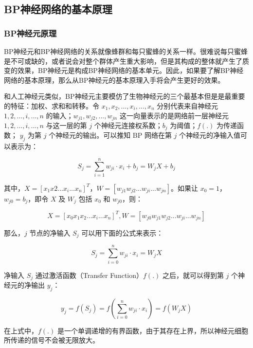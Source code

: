 \documentclass[UTF8]{ctexart}
\begin{document}
\subsection{BP神经网络的基本原理}

\subsubsection{BP神经元原理}

BP神经元和BP神经网络的关系就像蜂群和每只蜜蜂的关系一样。很难说每只蜜蜂是不可或缺的，或者说会对整个群体产生重大影响，但是其构成的整体就产生了质变的效果，BP神经元是构成BP神经网络的基本单元。因此，如果要了解BP神经网络的基本原理，那么从BP神经元的基本原理入手将会产生更好的效果。 \par

和人工神经元类似，BP神经元主要模仿了生物神经元的三个最基本但是是最重要的特征：加权、求和和转移。令 $x_1,x_2,...,x_i,...,x_n$ 分别代表来自神经元 $1,2,...,i,...,n$ 的输入；$w_{j1},w_{j2},...,w_{jn}$ 这一向量表示的是网络前一层神经元 $1,2,...,i,...,n$ 与这一层的第 $j$ 个神经元连接权系数；$b_j$ 为阈值；$f(.)$ 为传递函数； $y_j$ 为第 $j$ 个神经元的输出。可以推知 BP 网络在第 $j$ 个神经元的净输入值可以表示为：

\begin{equation} 
S_j = \sum_{i=1}^n w_{ji} \cdot x_i + b_j = W_j X + b_j
\end{equation}

其中，$X = [x_1x2...x_i...x_n]^T$，$W=[w_{j1}w_{j2}...w_{ji}...w_{jn}]$。如果让 $x_0=1$，$w_{j0}=b_j$，即令 $X$ 及 $W_j$ 包括 $x_0$ 和 $w_{j0}$，则：

\begin{equation} 
X=[x_0x_1x_2...x_i...x_n]^T,W=[w_{j0}w_{j1}w_{j2}...w_{ji}...w_{jn}]
\end{equation}

那么，$j$ 节点的净输入 $S_j$ 可以用下面的公式来表示：

\begin{equation} 
S_j = \sum_{i=0}^n w_{ji} \cdot x_i = W_j X
\end{equation}

净输入 $S_j$ 通过激活函数（Transfer Function）$f(.)$ 之后，就可以得到第 $j$ 个神经元的净输出 $y_j$：

\begin{equation} 
y_j = f(S_j) = f(\sum_{i=0}^n w_{ji} \cdot x_i) = f(W_j X)
\end{equation}

在上式中，$f(.)$ 是一个单调递增的有界函数，由于其存在上界，所以神经元细胞所传递的信号不会被无限放大。
\end{document}

